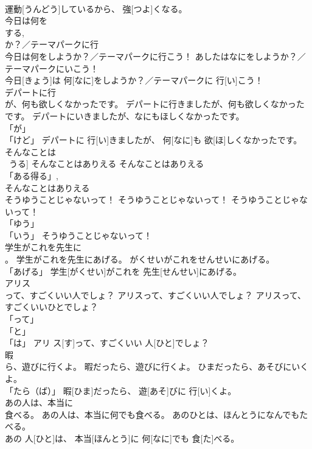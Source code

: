 \documentclass[8pt]{extreport}
\begin{document}
\begin{CJK}{UTF8}{min}
\\	運動[うんどう]しているから、 強[つよ]くなる。		
\\	今日は何を
\\	する, 
\\	か？／テーマパークに行
\\	今日は何をしようか？／テーマパークに行こう！	あしたはなにをしようか？／テーマパークにいこう！	
\\	今日[きょう]は 何[なに]をしようか？／テーマパークに 行[い]こう！		
\\	デパートに行
\\	が、何も欲しくなかったです。	デパートに行きましたが、何も欲しくなかったです。	デパートにいきましたが、なにもほしくなかったです。	
\\	「が」 
\\	「けど」	デパートに 行[い]きましたが、 何[なに]も 欲[ほ]しくなかったです。		
\\	そんなことは
\\	~うる]	そんなことはありえる	そんなことはありえる	
\\	「ある得る」, 
\\	そんなことはありえる		
\\	そうゆうことじゃないって！	そうゆうことじゃないって！	そうゆうことじゃないって！	
\\	「ゆう」 
\\	「いう」	そうゆうことじゃないって！		
\\	学生がこれを先生に
\\	。	学生がこれを先生にあげる。	がくせいがこれをせんせいにあげる。	
\\	「あげる」	学生[がくせい]がこれを 先生[せんせい]にあげる。		
\\	アリス
\\	って、すごくいい人でしょ？	アリスって、すごくいい人でしょ？	アリスって、すごくいいひとでしょ？	
\\	「って」 
\\	「と」 
\\	「は」	アリ ス[す]って、すごくいい 人[ひと]でしょ？		
\\	暇
\\	ら、遊びに行くよ。	暇だったら、遊びに行くよ。	ひまだったら、あそびにいくよ。	
\\	「たら（ば）」	暇[ひま]だったら、 遊[あそ]びに 行[い]くよ。		
\\	あの人は、本当に
\\	食べる。	あの人は、本当に何でも食べる。	あのひとは、ほんとうになんでもたべる。	
\\	あの 人[ひと]は、 本当[ほんとう]に 何[なに]でも 食[た]べる。		

\end{CJK}
\end{document}
